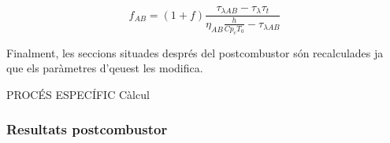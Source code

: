 \begin{equation}
	f_{AB}=(1+f)\frac{\tau_{\lambda AB}-\tau_{\lambda}\tau_t}{\eta_{AB}\frac{h}{Cp_cT_0}-\tau_{\lambda AB}}
\end{equation}
 
 
\noindent Finalment, les seccions situades després del postcombustor són recalculades ja que els paràmetres d'qeuest les modifica.



PROCÉS ESPECÍFIC Càlcul

\subsubsection{Resultats postcombustor}

